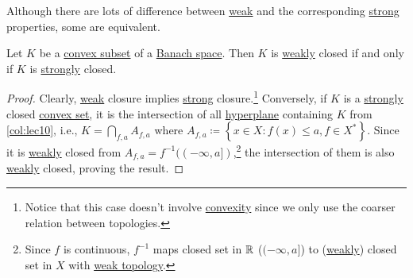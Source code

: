 Although there are lots of difference between \hyperref[def:weak-topology]{weak} and the corresponding \hyperref[note:strong-topology]{strong} properties, some are equivalent.

\begin{proposition}\label{prop:weak-closedness}
	Let \(K\) be a \hyperref[def:convex-set]{convex subset} of a \hyperref[def:Banach-space]{Banach space}. Then \(K\) is \hyperref[def:weak-topology]{weakly} closed if and only if \(K\) is \hyperref[note:strong-topology]{strongly} closed.
\end{proposition}
\begin{proof}
	Clearly, \hyperref[def:weak-topology]{weak} closure implies \hyperref[note:strong-topology]{strong} closure.\footnote{Notice that this case doesn't involve \hyperref[def:convex-set]{convexity} since we only use the coarser relation between topologies.} Conversely, if \(K\) is a \hyperref[note:strong-topology]{strongly} closed \hyperref[def:convex-set]{convex set}, it is the intersection of all \hyperref[def:hyperplane]{hyperplane} containing \(K\) from \autoref{col:lec10}, i.e., \(K = \bigcap_{f, a} A_{f, a}\) where \(A_{f, a}\coloneqq \left\{ x\in X \colon f(x) \leq a, f\in X^{\ast} \right\} \). Since it is \hyperref[def:weak-topology]{weakly} closed from \(A_{f, a}= f^{-1} ((-\infty , a])\),\footnote{Since \(f\) is continuous, \(f^{-1} \) maps closed set in \(\mathbb{\MakeUppercase{r}}\) (\((-\infty , a]\)) to (\hyperref[def:weak-topology]{weakly}) closed set in \(X\) with \hyperref[def:weak-topology]{weak topology}.} the intersection of them is also \hyperref[def:weak-topology]{weakly} closed, proving the result.
\end{proof}